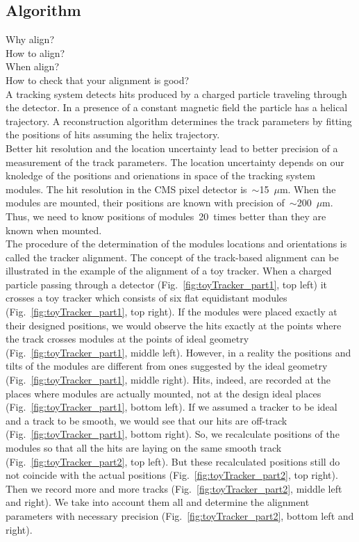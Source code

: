 \subsection{Algorithm}
\label{sec:alignmentAlg}

Why align?\\
How to align?\\
When align?\\
How to check that your alignment is good?\\

A tracking system detects hits produced by a charged particle traveling through the detector. In a presence of a constant magnetic field the particle has a helical trajectory. A reconstruction algorithm determines the track parameters by fitting the positions of hits assuming the helix trajectory.\\

Better hit resolution and the location uncertainty lead to better precision of a measurement of the track parameters. The location uncertainty depends on our knoledge of the positions and orienations in space of the tracking system modules. The hit resolution in the CMS pixel detector is~$\sim$15~$\mu$m. When the modules are mounted, their positions are known with precision of~$\sim$200~$\mu$m. Thus, we need to know positions of modules~20~times better than they are known when mounted.\\  

The procedure of the determination of the modules locations and orientations is called the tracker alignment. The concept of the track-based alignment can be illustrated in the example of the alignment of a toy tracker. When a charged particle passing through a detector (Fig.~\ref{fig:toyTracker_part1}, top left) it crosses a toy tracker which consists of six flat equidistant modules (Fig.~\ref{fig:toyTracker_part1}, top right). If the modules were placed exactly at their designed positions, we would observe the hits exactly at the points where the track crosses modules at the points of ideal geometry (Fig.~\ref{fig:toyTracker_part1}, middle left). However, in a reality the positions and tilts of the modules are different from ones suggested by the ideal geometry (Fig.~\ref{fig:toyTracker_part1}, middle right). Hits, indeed, are recorded at the places where modules are actually mounted, not at the design ideal places (Fig.~\ref{fig:toyTracker_part1}, bottom left). If we assumed a tracker to be ideal and a track to be smooth, we would see that our hits are off-track (Fig.~\ref{fig:toyTracker_part1}, bottom right). So, we recalculate positions of the modules so that all the hits are laying on the same smooth track (Fig.~\ref{fig:toyTracker_part2}, top left). But these recalculated positions still do not coincide with the actual positions (Fig.~\ref{fig:toyTracker_part2}, top right). Then we record more and more tracks (Fig.~\ref{fig:toyTracker_part2}, middle left and right). We take into account them all and determine the alignment parameters with necessary precision (Fig.~\ref{fig:toyTracker_part2}, bottom left and right).\\


